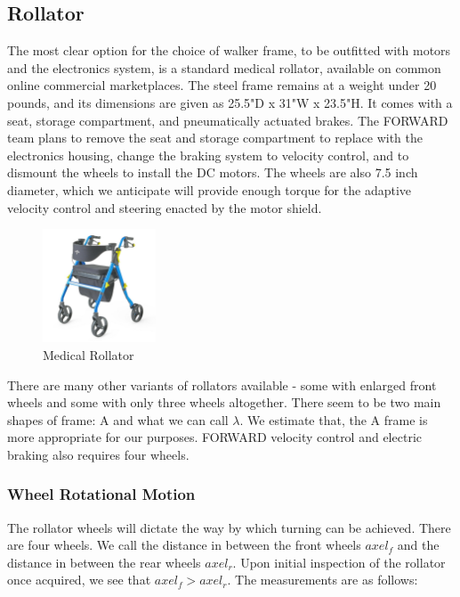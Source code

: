 \subsection{Rollator}
\noindent The most clear option for the choice of walker frame, to be outfitted with motors and the electronics system, is a standard medical rollator, available on common online commercial marketplaces. The steel frame remains at a weight under 20 pounds, and its dimensions are given as 25.5"D x 31"W x 23.5"H. It comes with a seat, storage compartment, and pneumatically actuated brakes. The FORWARD team plans to remove the seat and storage compartment to replace with the electronics housing, change the braking system to velocity control, and to dismount the wheels to install the DC motors. The wheels are also 7.5 inch diameter, which we anticipate will provide enough torque for the adaptive velocity control and steering enacted by the motor shield.\\

\begin{figure}[H]
	\centering
	\includegraphics[width=0.3\textwidth]{./Images/rollator-amaz.jpg}
	\caption{\label{fig:rollator-amaz}Medical Rollator}
\end{figure}

\noindent There are many other variants of rollators available - some with enlarged front wheels and some with only three wheels altogether. There seem to be two main shapes of frame: A and what we can call $\lambda$. We estimate that, the A frame is more appropriate for our purposes. FORWARD velocity control and electric braking also requires four wheels.\\

\subsubsection{Wheel Rotational Motion}
\noindent The rollator wheels will dictate the way by which turning can be achieved. There are four wheels. We call the distance in between the front wheels $axel_f$ and the distance in between the rear wheels $axel_r$. Upon initial inspection of the rollator once acquired, we see that $axel_f > axel_r$. The measurements are as follows:\\

